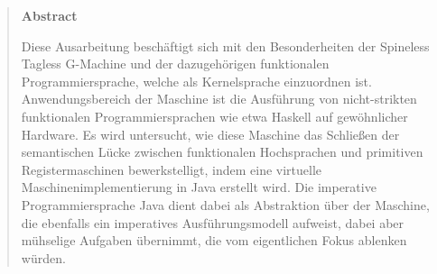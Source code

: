 
\pagestyle{empty}
\begin{quote}
  \vspace*{4cm}

  \begin{center}
    \textbf{\Large Abstract}
  \end{center}

  \vspace{1em}

  Diese Ausarbeitung beschäftigt sich mit den Besonderheiten der Spineless Tagless G-Machine und der dazugehörigen funktionalen Programmiersprache, welche als Kernelsprache einzuordnen ist.
  Anwendungsbereich der Maschine ist die Ausführung von nicht-strikten funktionalen Programmiersprachen wie etwa Haskell auf gewöhnlicher Hardware.
  Es wird untersucht, wie diese Maschine das Schließen der semantischen Lücke zwischen funktionalen Hochsprachen und primitiven Registermaschinen bewerkstelligt, indem eine virtuelle Maschinenimplementierung in Java erstellt wird.
  Die imperative Programmiersprache Java dient dabei als Abstraktion über der Maschine, die ebenfalls ein imperatives Ausführungsmodell aufweist, dabei aber mühselige Aufgaben übernimmt, die vom eigentlichen Fokus ablenken würden.
\end{quote}


